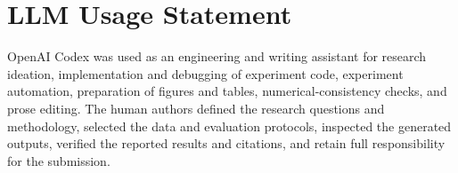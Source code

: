 \section*{LLM Usage Statement}
OpenAI Codex was used as an engineering and writing assistant for research
ideation, implementation and debugging of experiment code, experiment
automation, preparation of figures and tables, numerical-consistency checks,
and prose editing. The human authors defined the research questions and
methodology, selected the data and evaluation protocols, inspected the
generated outputs, verified the reported results and citations, and retain
full responsibility for the submission.
